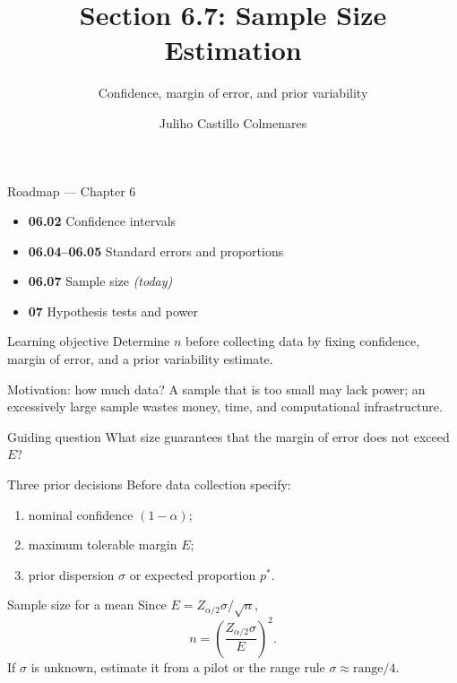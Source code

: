\documentclass[10pt,aspectratio=169]{beamer}
\title[Sample Size]{Section 6.7: Sample Size Estimation}
\subtitle{Confidence, margin of error, and prior variability}
\author[J. Castillo Colmenares]{Juliho Castillo Colmenares}
\institute{Tecnológico de Monterrey}
\date{}
\begin{document}
\begin{frame}[plain]\vspace{-0.8cm}\titlepage\end{frame}

\begin{frame}{Roadmap --- Chapter 6}
  \footnotesize
  \begin{itemize}\itemsep=0.08cm
    \item \textbf{06.02} Confidence intervals
    \item \textbf{06.04--06.05} Standard errors and proportions
    \item \textbf{06.07} Sample size \emph{(today)}
    \item \textbf{07} Hypothesis tests and power
  \end{itemize}
  \begin{block}{Learning objective}
    Determine $n$ before collecting data by fixing confidence, margin of error,
    and a prior variability estimate.
  \end{block}
\end{frame}

\begin{frame}{Motivation: how much data?}
  \footnotesize
  A sample that is too small may lack power; an excessively large sample wastes
  money, time, and computational infrastructure.
  \begin{alertblock}{Guiding question}
    What size guarantees that the margin of error does not exceed $E$?
  \end{alertblock}
\end{frame}

\begin{frame}{Three prior decisions}
  \footnotesize
  Before data collection specify:
  \begin{enumerate}\itemsep=0.12cm
    \item nominal confidence $(1-\alpha)$;
    \item maximum tolerable margin $E$;
    \item prior dispersion $\sigma$ or expected proportion $p^*$.
  \end{enumerate}
\end{frame}

\begin{frame}{Sample size for a mean}
  \footnotesize
  Since $E=Z_{\alpha/2}\sigma/\sqrt n$,
  \[
    n=\left(\frac{Z_{\alpha/2}\sigma}{E}\right)^2.
  \]
  If $\sigma$ is unknown, estimate it from a pilot or the range rule
  $\sigma\approx\text{range}/4$.
\end{frame}
\end{document}
